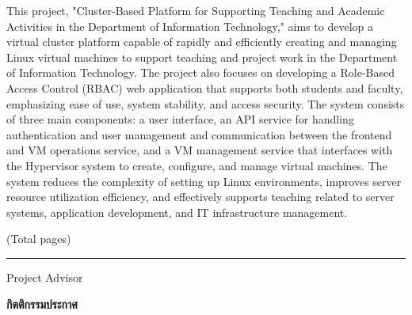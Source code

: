 \hspace*{1.5em} %
This project, "Cluster-Based Platform for Supporting Teaching and Academic Activities in the Department of Information Technology," aims to develop a virtual cluster platform capable of rapidly and efficiently creating and managing Linux virtual machines to support teaching and project work in the Department of Information Technology. The project also focuses on developing a Role-Based Access Control (RBAC) web application that supports both students and faculty, emphasizing ease of use, system stability, and access security. The system consists of three main components: a user interface, an API service for handling authentication and user management and communication between the frontend and VM operations service, and a VM management service that interfaces with the Hypervisor system to create, configure, and manage virtual machines. The system reduces the complexity of setting up Linux environments, improves server resource utilization efficiency, and effectively supports teaching related to server systems, application development, and IT infrastructure management.

\begin{flushright}
(Total \pageref{LastPage} pages)

\vfill

\rule{12 cm}{0.4pt} Project Advisor

\end{flushright}


\newpage
{}
{}
\begin{center}\textbf{กิตติกรรมประกาศ}\end{center}

